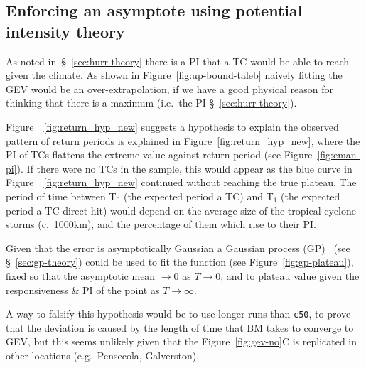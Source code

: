 \subsection{Enforcing an asymptote using potential intensity theory }
\label{sec:evt-limit}

As noted in~§~\ref{sec:hurr-theory} there is a PI
that a TC would be able to reach given the climate.
As shown in Figure~\ref{fig:up-bound-taleb} naively fitting
the GEV would be an over-extrapolation, if we have a good physical reason for
thinking that there is a maximum
(i.e.~the PI §~\ref{sec:hurr-theory}).

Figure~~\ref{fig:return_hyp_new} suggests a hypothesis to explain the observed pattern of return periods is explained in
Figure~\ref{fig:return_hyp_new}, where the PI of TCs flattens the extreme
value against return period (see Figure~\ref{fig:eman-pi}).
If there were no TCs in the sample, this would appear as the blue curve in Figure~~\ref{fig:return_hyp_new} continued without reaching the true plateau.
The period of time between T$_0$ (the expected period a TC) and T$_1$ (the expected period a TC direct hit)
would depend on the average size of the tropical cyclone storms (c.~1000km),
and the percentage of them which rise to their PI.

Given that
the error is asymptotically Gaussian
a Gaussian process (GP)~\cite{williams2006gaussian, duvenaud2014automatic} (see §~\ref{sec:gp-theory})
could be used to fit the function (see Figure~\ref{fig:gp-plateau}), fixed so that
the asymptotic mean $\to0$ as $T\to0$, and to plateau value given the
responsiveness \& PI of the point as $T\to\infty$.

A way to falsify this hypothesis would be to use longer runs than \texttt{c50},
to prove that the deviation is caused by the length of time that BM takes to
converge to GEV, but this seems unlikely given that the Figure~\ref{fig:gev-no}C
is replicated in other locations (e.g.~Pensecola, Galverston).






\FloatBarrier
